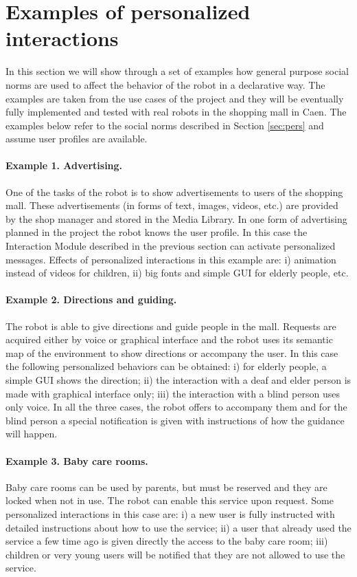 \vspace{-0.2cm}
\section{Examples of personalized interactions}
\vspace{-0.1cm}

In this section we will show through a set of examples how general purpose social norms are used to affect the behavior of the robot in a declarative way. The examples are taken from the use cases of the {\coaches} project and they will be eventually fully implemented and tested with real robots in the shopping mall in Caen. The examples below refer to the social norms described in Section \ref{sec:pers} and assume user profiles are available.

\paragraph{Example 1. Advertising.} One of the tasks of the {\coaches} robot is to show advertisements to users of the shopping mall. These advertisements (in forms of text, images, videos, etc.) are provided by the shop manager and stored in the Media Library. 
In one form of advertising planned in the project the robot knows the user profile. In this case the Interaction Module described in the previous section can activate personalized messages.
Effects of personalized interactions in this example are: i) animation instead of videos for children, ii) big fonts and simple GUI for elderly people, etc. 

\paragraph{Example 2. Directions and guiding.} The robot is able to give directions and guide people in the mall. Requests are acquired either by voice or graphical interface and the robot uses its semantic map of the environment to show directions or accompany the user. In this case the following personalized behaviors can be obtained: i) for elderly people, a simple GUI shows the direction; ii) the interaction with a deaf and elder person is made with graphical interface only; iii) the interaction with a blind person uses only voice. In all the three cases, the robot offers to accompany them and for the blind person a special notification is given with instructions of how the guidance will happen.

\paragraph{Example 3. Baby care rooms.} Baby care rooms can be used by parents, but must be reserved and they are locked when not in use. The robot can enable this service upon request. Some personalized interactions in this case are: i) a new user is fully instructed with detailed instructions about how to use the service; ii) a user that already used the service a few time ago is given directly the access to the baby care room; iii) children or very young users will be notified that they are not allowed to use the service.

